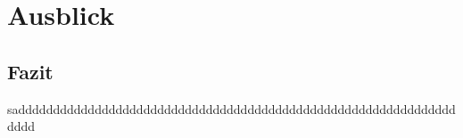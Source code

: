 
\chapter{Ausblick}


\section{Fazit}
saddddddddddddddddddddddddddddddddddddddddddddddddddddddddddddddddddd
